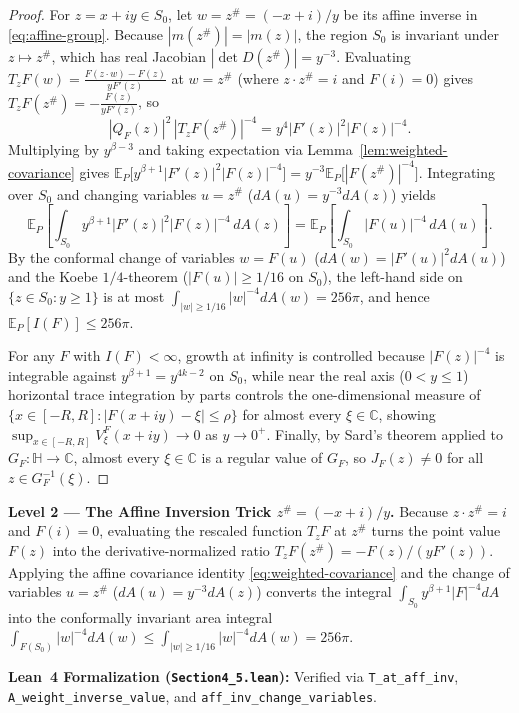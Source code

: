 \documentclass[12pt]{article}
\def\C{\mathbb{C}}
\def\H{\mathbb{H}}
\def\E{\mathbb{E}}
\theoremstyle{definition}
\numberwithin{equation}{section}
\begin{document}
\begin{proof}
For $z = x+iy \in S_0$, let $w = z^\# = (-x+i)/y$ be its affine inverse in \eqref{eq:affine-group}. Because $|m(z^\#)| = |m(z)|$, the region $S_0$ is invariant under $z \mapsto z^\#$, which has real Jacobian $|\det D(z^\#)| = y^{-3}$. Evaluating $T_z F(w) = \frac{F(z\cdot w)-F(z)}{yF'(z)}$ at $w = z^\#$ (where $z \cdot z^\# = i$ and $F(i) = 0$) gives $T_z F(z^\#) = -\frac{F(z)}{y F'(z)}$, so
\[
  |Q_F(z)|^2 \, |T_z F(z^\#)|^{-4} = y^4 |F'(z)|^2 |F(z)|^{-4}.
\]
Multiplying by $y^{\beta - 3}$ and taking expectation via Lemma~\ref{lem:weighted-covariance} gives $\E_P\big[y^{\beta+1}|F'(z)|^2 |F(z)|^{-4}\big] = y^{-3}\E_P\big[|F(z^\#)|^{-4}\big]$. Integrating over $S_0$ and changing variables $u = z^\#$ ($dA(u) = y^{-3} dA(z)$) yields
\[
  \E_P\left[\int_{S_0} y^{\beta+1} |F'(z)|^2 |F(z)|^{-4} \, dA(z)\right] = \E_P\left[\int_{S_0} |F(u)|^{-4} \, dA(u)\right].
\]
By the conformal change of variables $w = F(u)$ ($dA(w) = |F'(u)|^2 dA(u)$) and the Koebe $1/4$-theorem ($|F(u)| \ge 1/16$ on $S_0$), the left-hand side on $\{z \in S_0 : y \ge 1\}$ is at most $\int_{|w|\ge 1/16} |w|^{-4} dA(w) = 256\pi$, and hence $\E_P[I(F)] \le 256\pi$.

For any $F$ with $I(F) < \infty$, growth at infinity is controlled because $|F(z)|^{-4}$ is integrable against $y^{\beta+1} = y^{4k-2}$ on $S_0$, while near the real axis ($0 < y \le 1$) horizontal trace integration by parts controls the one-dimensional measure of $\{x \in [-R, R] : |F(x+iy) - \xi| \le \rho\}$ for almost every $\xi \in \C$, showing $\sup_{x \in [-R, R]} V_\xi^F(x+iy) \to 0$ as $y \to 0^+$. Finally, by Sard's theorem applied to $G_F : \H \to \C$, almost every $\xi \in \C$ is a regular value of $G_F$, so $J_F(z) \ne 0$ for all $z \in G_F^{-1}(\xi)$.
\end{proof}

\begin{leveltwo}
\noindent\textbf{\textcolor{l2border}{Level 2 --- The Affine Inversion Trick $z^\# = (-x+i)/y$.}}
Because $z \cdot z^\# = i$ and $F(i) = 0$, evaluating the rescaled function $T_z F$ at $z^\#$ turns the point value $F(z)$ into the derivative-normalized ratio $T_z F(z^\#) = -F(z)/(yF'(z))$. Applying the affine covariance identity \eqref{eq:weighted-covariance} and the change of variables $u = z^\#$ ($dA(u) = y^{-3} dA(z)$) converts the integral $\int_{S_0} y^{\beta+1}|F|^{-4} dA$ into the conformally invariant area integral $\int_{F(S_0)} |w|^{-4} dA(w) \le \int_{|w|\ge 1/16} |w|^{-4} dA(w) = 256\pi$.

\smallskip
\noindent\textbf{\textcolor{leannote}{Lean~4 Formalization (\texttt{Section4\_5.lean}):}} Verified via \texttt{T\_at\_aff\_inv}, \texttt{A\_weight\_inverse\_value}, and \texttt{aff\_inv\_change\_variables}.
\end{leveltwo}
\end{document}
